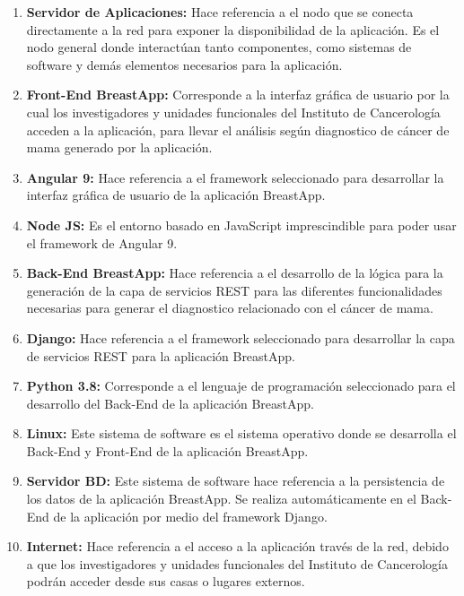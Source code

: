 \begin{enumerate}[label=\textbf{\arabic*})]
	
\item  \textbf{Servidor de Aplicaciones:} Hace referencia a el nodo que se conecta directamente a la red para exponer la disponibilidad de la aplicación. Es el nodo general donde interactúan tanto componentes, como sistemas de software y demás elementos necesarios para
la aplicación.

\item \textbf{Front-End BreastApp:} Corresponde a la interfaz gráfica de usuario por la cual los investigadores y unidades funcionales del Instituto de Cancerología acceden a la aplicación, para llevar el análisis según diagnostico de cáncer de mama generado por la aplicación.

\item \textbf{Angular 9:} Hace referencia a el framework seleccionado para desarrollar  la interfaz gráfica de usuario de la aplicación BreastApp.

\item \textbf{Node JS:} Es el entorno basado en JavaScript imprescindible para poder usar el framework de Angular 9.

\item \textbf{Back-End BreastApp:} Hace referencia a el desarrollo de la lógica para la generación de la capa de servicios REST para las diferentes funcionalidades necesarias para generar el diagnostico relacionado con el cáncer de mama.

\item \textbf{Django:} Hace referencia a el framework seleccionado para desarrollar la capa de servicios REST para la aplicación BreastApp.

\item \textbf{Python 3.8:} Corresponde a el lenguaje de programación seleccionado para el desarrollo del Back-End de la aplicación BreastApp.

\item \textbf{Linux:} Este sistema de software es el sistema operativo donde se desarrolla el Back-End y Front-End de la aplicación BreastApp.

\item \textbf{Servidor BD:} Este sistema de software hace referencia a la persistencia de los datos de la aplicación BreastApp. Se realiza  automáticamente en el Back-End de la aplicación por medio del framework Django.

\item \textbf{Internet:} Hace referencia a el acceso a la aplicación  través de la red, debido a que los  investigadores y unidades funcionales del Instituto de Cancerología podrán acceder desde sus casas o lugares externos.


\end{enumerate}
